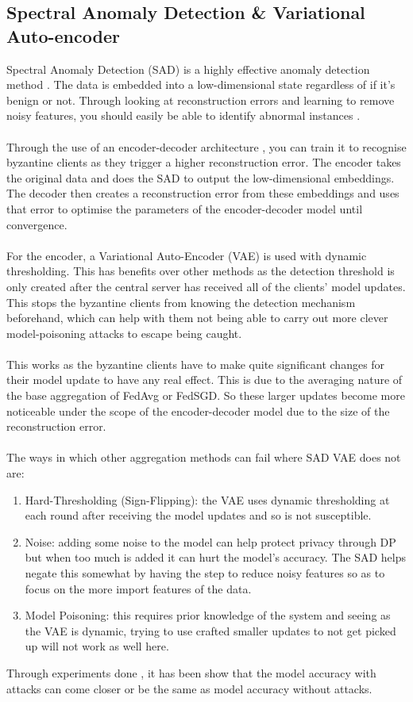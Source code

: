 \subsection{Spectral Anomaly Detection \& Variational Auto-encoder}
Spectral Anomaly Detection (SAD) is a highly effective anomaly detection method \cite{sad}.
The data is embedded into a low-dimensional state regardless of if it's benign or not.
Through looking at reconstruction errors and learning to remove noisy features, you should easily be able to identify abnormal instances \cite{variationalAB}.
\\ \\
Through the use of an encoder-decoder architecture \cite{spectral}, you can train it to recognise byzantine clients as they trigger a higher reconstruction error.
The encoder takes the original data and does the SAD to output the low-dimensional embeddings.
The decoder then creates a reconstruction error from these embeddings and uses that error to optimise the parameters of the encoder-decoder model until convergence.
\\ \\
For the encoder, a Variational Auto-Encoder (VAE) is used with dynamic thresholding.
This has benefits over other methods as the detection threshold is only created after the central server has received all of the clients' model updates.
This stops the byzantine clients from knowing the detection mechanism beforehand, which can help with them not being able to carry out more clever model-poisoning attacks to escape being caught.
\\ \\
This works as the byzantine clients have to make quite significant changes for their model update to have any real effect.
This is due to the averaging nature of the base aggregation of FedAvg or FedSGD.
So these larger updates become more noticeable under the scope of the encoder-decoder model due to the size of the reconstruction error.
\\ \\
The ways in which other aggregation methods can fail where SAD VAE does not are:
\begin{enumerate}
    \item Hard-Thresholding (Sign-Flipping): the VAE uses dynamic thresholding at each round after receiving the model updates and so is not susceptible.
    
    \item Noise: adding some noise to the model can help protect privacy through DP but when too much is added it can hurt the model's accuracy. 
    The SAD helps negate this somewhat by having the step to reduce noisy features so as to focus on the more import features of the data.
    
    \item Model Poisoning: this requires prior knowledge of the system and seeing as the VAE is dynamic, trying to use crafted smaller updates to not get picked up will not work as well here.
\end{enumerate}
Through experiments done \cite{spectral}, it has been show that the model accuracy with attacks can come closer or be the same as model accuracy without attacks.
